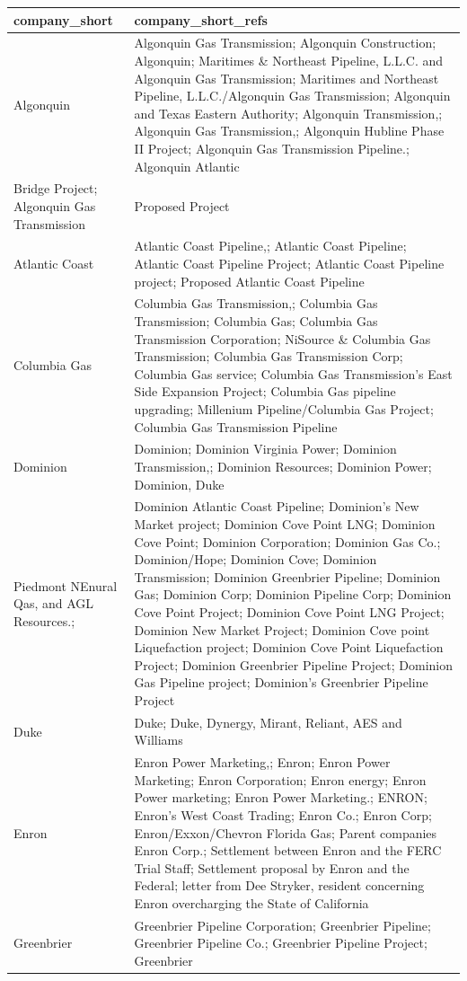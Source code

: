 \documentclass[]{article}
\begin{document}
\begin{longtable}[]{@{}ll@{}}
\toprule
company\_short & company\_short\_refs\tabularnewline
\midrule
\endhead
Algonquin & Algonquin Gas Transmission; Algonquin Construction;
Algonquin; Maritimes \& Northeast Pipeline, L.L.C. and Algonquin Gas
Transmission; Maritimes and Northeast Pipeline, L.L.C./Algonquin Gas
Transmission; Algonquin and Texas Eastern Authority; Algonquin
Transmission,; Algonquin Gas Transmission,; Algonquin Hubline Phase II
Project; Algonquin Gas Transmission Pipeline.; Algonquin
Atlantic\tabularnewline
Bridge Project; Algonquin Gas Transmission & Proposed
Project\tabularnewline
Atlantic Coast & Atlantic Coast Pipeline,; Atlantic Coast Pipeline;
Atlantic Coast Pipeline Project; Atlantic Coast Pipeline project;
Proposed Atlantic Coast Pipeline\tabularnewline
Columbia Gas & Columbia Gas Transmission,; Columbia Gas Transmission;
Columbia Gas; Columbia Gas Transmission Corporation; NiSource \&
Columbia Gas Transmission; Columbia Gas Transmission Corp; Columbia Gas
service; Columbia Gas Transmission's East Side Expansion Project;
Columbia Gas pipeline upgrading; Millenium Pipeline/Columbia Gas
Project; Columbia Gas Transmission Pipeline\tabularnewline
Dominion & Dominion; Dominion Virginia Power; Dominion Transmission,;
Dominion Resources; Dominion Power; Dominion, Duke\tabularnewline
Piedmont NEnural Qas, and AGL Resources.; & Dominion Atlantic Coast
Pipeline; Dominion's New Market project; Dominion Cove Point LNG;
Dominion Cove Point; Dominion Corporation; Dominion Gas Co.;
Dominion/Hope; Dominion Cove; Dominion Transmission; Dominion Greenbrier
Pipeline; Dominion Gas; Dominion Corp; Dominion Pipeline Corp; Dominion
Cove Point Project; Dominion Cove Point LNG Project; Dominion New Market
Project; Dominion Cove point Liquefaction project; Dominion Cove Point
Liquefaction Project; Dominion Greenbrier Pipeline Project; Dominion Gas
Pipeline project; Dominion's Greenbrier Pipeline Project\tabularnewline
Duke & Duke; Duke, Dynergy, Mirant, Reliant, AES and
Williams\tabularnewline
Enron & Enron Power Marketing,; Enron; Enron Power Marketing; Enron
Corporation; Enron energy; Enron Power marketing; Enron Power
Marketing.; ENRON; Enron's West Coast Trading; Enron Co.; Enron Corp;
Enron/Exxon/Chevron Florida Gas; Parent companies Enron Corp.;
Settlement between Enron and the FERC Trial Staff; Settlement proposal
by Enron and the Federal; letter from Dee Stryker, resident concerning
Enron overcharging the State of California\tabularnewline
Greenbrier & Greenbrier Pipeline Corporation; Greenbrier Pipeline;
Greenbrier Pipeline Co.; Greenbrier Pipeline Project; Greenbrier

\end{longtable}
\end{document}
